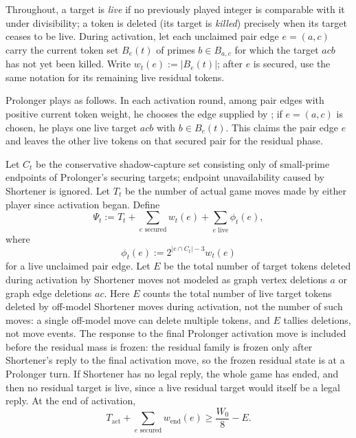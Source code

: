\begin{proposition}\label{prop:t2-activation-potential}
Throughout, a target is \emph{live} if no previously played integer is
comparable with it under divisibility; a token is deleted (its target is
\emph{killed}) precisely when its target ceases to be live.
During activation, let each unclaimed pair edge $e=(a,c)$ carry the current
token set $B_e(t)$ of primes $b\in B_{a,c}$ for which the target $acb$ has not
yet been killed.  Write $w_t(e):=|B_e(t)|$; after $e$ is secured, use the same
notation for its remaining live residual tokens.

Prolonger plays as follows.  In each activation round, among pair edges with
positive current token weight, he chooses the edge supplied by
; if $e=(a,c)$ is chosen, he plays one live
target $acb$ with $b\in B_e(t)$.  This claims the pair edge $e$ and leaves the
other live tokens on that secured pair for the residual phase.

Let $C_t$ be the conservative shadow-capture set consisting only of small-prime
endpoints of Prolonger's securing targets; endpoint unavailability caused by
Shortener is ignored.  Let $T_t$ be the number of actual game moves made by
either player since activation began.  Define
\[
  \Psi_t
  :=
  T_t
  +\sum_{e\text{ secured}}w_t(e)
  +\sum_{e\text{ live}}\phi_t(e),
\]
where
\[
  \phi_t(e):=2^{|e\cap C_t|-3}w_t(e)
\]
for a live unclaimed pair edge.
Let $E$ be the total number of target tokens deleted during activation by
Shortener moves not modeled as graph vertex deletions $a$ or graph edge
deletions $ac$.  Here $E$ counts the total number of live target tokens deleted
by off-model Shortener moves during activation, not the number of such moves:
a single off-model move can delete multiple tokens, and $E$ tallies deletions,
not move events.  The response to the final Prolonger activation move is
included before the residual mass is frozen: the residual family is frozen
only after Shortener's reply to the final activation move, so the frozen
residual state is at a Prolonger turn.  If Shortener has no legal reply, the
whole game has ended, and then no residual target is live, since a live
residual target would itself be a legal reply.  At the end of activation,
\[
  T_{\mathrm{act}}
  +
  \sum_{e\text{ secured}} w_{\mathrm{end}}(e)
  \ge
  \frac{W_0}{8}-E.
\]
\end{proposition}


